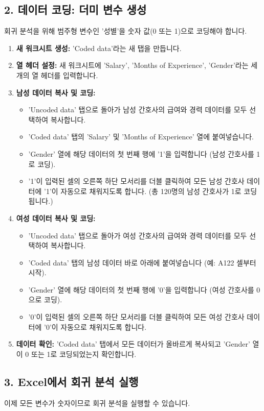 \documentclass[11pt,a4paper]{article}
\theoremstyle{definition}
\begin{document}
\subsection{2. 데이터 코딩: 더미 변수 생성}
회귀 분석을 위해 범주형 변수인 '성별'을 숫자 값(0 또는 1)으로 코딩해야 합니다.

\begin{enumerate}
    \item \textbf{새 워크시트 생성:} 'Coded data'라는 새 탭을 만듭니다.
    \item \textbf{열 헤더 설정:} 새 워크시트에 'Salary', 'Months of Experience', 'Gender'라는 세 개의 열 헤더를 입력합니다.
    \item \textbf{남성 데이터 복사 및 코딩:}
    \begin{itemize}
        \item 'Uncoded data' 탭으로 돌아가 남성 간호사의 급여와 경력 데이터를 모두 선택하여 복사합니다.
        \item 'Coded data' 탭의 'Salary' 및 'Months of Experience' 열에 붙여넣습니다.
        \item 'Gender' 열에 해당 데이터의 첫 번째 행에 '1'을 입력합니다 (남성 간호사를 1로 코딩).
        \item '1'이 입력된 셀의 오른쪽 하단 모서리를 더블 클릭하여 모든 남성 간호사 데이터에 '1'이 자동으로 채워지도록 합니다. (총 120명의 남성 간호사가 1로 코딩됩니다.)
    \end{itemize}
    \item \textbf{여성 데이터 복사 및 코딩:}
    \begin{itemize}
        \item 'Uncoded data' 탭으로 돌아가 여성 간호사의 급여와 경력 데이터를 모두 선택하여 복사합니다.
        \item 'Coded data' 탭의 남성 데이터 바로 아래에 붙여넣습니다 (예: A122 셀부터 시작).
        \item 'Gender' 열에 해당 데이터의 첫 번째 행에 '0'을 입력합니다 (여성 간호사를 0으로 코딩).
        \item '0'이 입력된 셀의 오른쪽 하단 모서리를 더블 클릭하여 모든 여성 간호사 데이터에 '0'이 자동으로 채워지도록 합니다.
    \end{itemize}
    \item \textbf{데이터 확인:} 'Coded data' 탭에서 모든 데이터가 올바르게 복사되고 'Gender' 열이 0 또는 1로 코딩되었는지 확인합니다.
\end{enumerate}

\subsection{3. Excel에서 회귀 분석 실행}
이제 모든 변수가 숫자이므로 회귀 분석을 실행할 수 있습니다.
\end{document}
